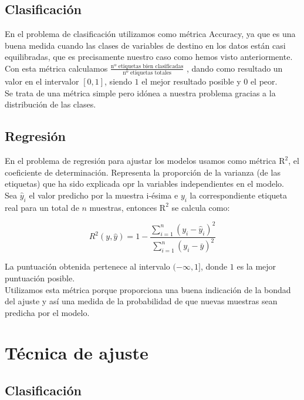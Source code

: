 \documentclass[12pt]{article}
\begin{document}
\subsection{Clasificación}

En el problema de clasificación utilizamos como métrica Accuracy, ya que es una buena medida cuando las clases de variables de destino en los datos están casi equilibradas, que es precisamente nuestro caso como hemos visto anteriormente.\\

Con esta métrica calculamos $\frac{\text{nº etiquetas bien clasificadas}}{\text{nº etiquetas totales}}$
, dando como resultado un valor en el intervalor $[0,1]$, siendo $1$ el mejor resultado posible y $0$ el peor.\\

Se trata de una métrica simple pero idónea a nuestra problema gracias a la distribución de las clases.

\subsection{Regresión}

En el problema de regresión para ajustar los modelos usamos como métrica $\text{R}^2$, el coeficiente de determinación. Representa la proporción de la varianza (de las etiquetas) que ha sido explicada opr la variables independientes en el modelo.\\

Sea $\hat{y}_i$ el valor predicho por la muestra i-ésima e $y_i$ la correspondiente etiqueta real para un total de $n$ muestras, entonces $\text{R}^2$ se calcula como:

$$R^2(y, \hat{y}) = 1 - \frac{\sum_{i=1}^{n} (y_i - \hat{y}_i)^2}{\sum_{i=1}^{n} (y_i - \bar{y})^2} $$

La puntuación obtenida pertenece al intervalo $(- \infty, 1]$, donde $1$ es la mejor puntuación posible.\\

Utilizamos esta métrica porque proporciona una buena indicación de la bondad del ajuste y así una medida de la probabilidad de que nuevas muestras sean predicha por el modelo.

\section{Técnica de ajuste}

\subsection{Clasificación}
\end{document}
